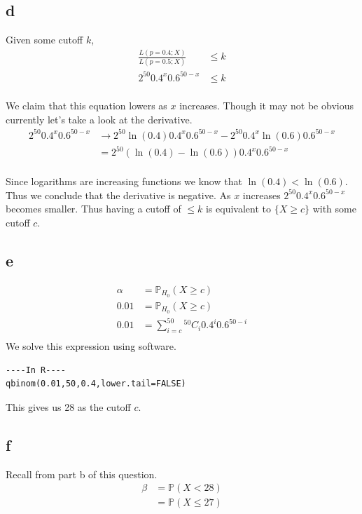 \documentclass{article}
\newcommand{\prob}{\mathbb{P}}
\begin{document}
\subsection{d}
Given some cutoff $k$,
\begin{align*}
    \frac{L(p=0.4;X)}{L(p=0.5;X)} &\leq k \\
    2^{50} 0.4^x 0.6^{50-x} &\leq k \\
\end{align*}

We claim that this equation lowers as $x$ increases.
Though it may not be obvious currently let's take a look at the derivative.
\begin{align*}
    2^{50} 0.4^x 0.6^{50-x} 
    &\to 2^{50} \ln(0.4) 0.4^x 0.6^{50-x} - 2^{50} 0.4^x \ln(0.6) 0.6^{50-x} \\
    &= 2^{50} (\ln(0.4) - \ln(0.6)) 0.4^x 0.6^{50-x} \\
\end{align*}

Since logarithms are increasing functions we know that $\ln(0.4) < \ln(0.6)$.
Thus we conclude that the derivative is negative. As $x$ increases 
$2^{50} 0.4^x 0.6^{50-x}$ becomes smaller. Thus having a cutoff of $\leq k$ is
equivalent to $\{X \geq c\}$ with some cutoff $c$.

\subsection{e}
\begin{align*}
    \alpha &= \prob_{H_0}(X \geq c) \\
    0.01 &= \prob_{H_0}(X \geq c) \\
    0.01 &= \sum_{i=c}^{50} {}^{50}C_i 0.4^i 0.6^{50-i} \\
\end{align*}
We solve this expression using software.
\begin{verbatim}
----In R----
qbinom(0.01,50,0.4,lower.tail=FALSE)
\end{verbatim}
This gives us 28 as the cutoff $c$.

\subsection{f}
Recall from part b of this question.
\begin{align*}
    \beta &= \prob(X < 28) \\
    &= \prob(X \leq 27) \\
\end{align*}
\end{document}
